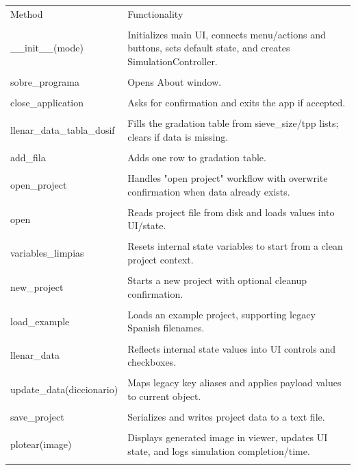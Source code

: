 ﻿\documentclass[11pt,a4paper]{article}
\begin{document}
\begin{longtable}{|p{}|p{}|}
\hline
Method & Functionality \\\\
\hline
\_\_init\_\_(mode) & Initializes main UI, connects menu/actions and buttons, sets default state, and creates SimulationController. \\\\
\hline
sobre\_programa & Opens About window. \\\\
\hline
close\_application & Asks for confirmation and exits the app if accepted. \\\\
\hline
llenar\_data\_tabla\_dosif & Fills the gradation table from sieve\_size/tpp lists; clears if data is missing. \\\\
\hline
add\_fila & Adds one row to gradation table. \\\\
\hline
open\_project & Handles "open project" workflow with overwrite confirmation when data already exists. \\\\
\hline
open & Reads project file from disk and loads values into UI/state. \\\\
\hline
variables\_limpias & Resets internal state variables to start from a clean project context. \\\\
\hline
new\_project & Starts a new project with optional cleanup confirmation. \\\\
\hline
load\_example & Loads an example project, supporting legacy Spanish filenames. \\\\
\hline
llenar\_data & Reflects internal state values into UI controls and checkboxes. \\\\
\hline
update\_data(diccionario) & Maps legacy key aliases and applies payload values to current object. \\\\
\hline
save\_project & Serializes and writes project data to a text file. \\\\
\hline
plotear(image) & Displays generated image in viewer, updates UI state, and logs simulation completion/time. \\\\

\end{longtable}
\end{document}
